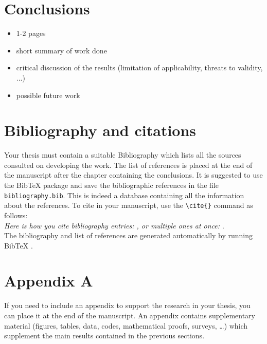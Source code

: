 \documentclass[11pt,a4paper]{article}
\begin{document}
\section{Conclusions}
\color{black}

\begin{itemize} 
    \item 1-2 pages
    \item short summary of work done
    \item critical discussion of the results (limitation of applicability, threats to validity, ...)
    \item possible future work 
\end{itemize}

\section{Bibliography and citations}
Your thesis must contain a suitable Bibliography which lists all the sources consulted on developing the work.
The list of references is placed at the end of the manuscript after the chapter containing the conclusions.
It is suggested to use the BibTeX package and save the bibliographic references in the file \verb|bibliography.bib|.
This is indeed a database containing all the information about the references. To cite in your manuscript, use the \verb|\cite{}| command as follows:
\\
\textit{Here is how you cite bibliography entries: \cite{knuth74}, or multiple ones at once: \cite{knuth92,lamport94}}.
\\
The bibliography and list of references are generated automatically by running BibTeX \cite{bibtex}.



\appendix
\section{Appendix A}
If you need to include an appendix to support the research in your thesis, you can place it at the end of the manuscript.
An appendix contains supplementary material (figures, tables, data, codes, mathematical proofs, surveys, \dots)
which supplement the main results contained in the previous sections.
\end{document}
